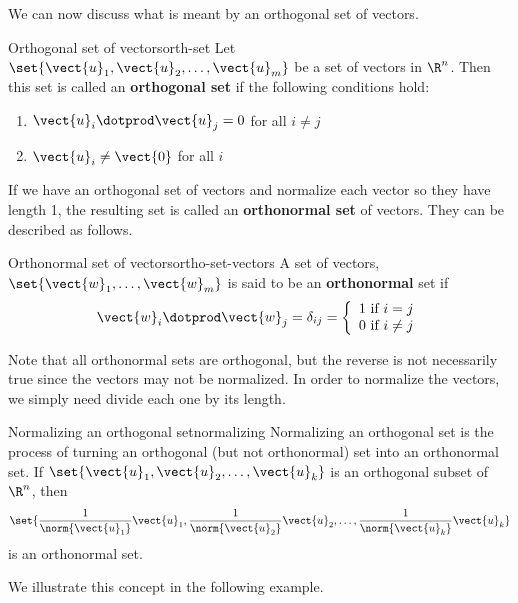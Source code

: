 We can now discuss what is meant by an orthogonal set of vectors. 

\begin{definition}{Orthogonal set of vectors}{orth-set}
Let $\set{\vect{u}_1, \vect{u}_2,\ldots, \vect{u}_m}$ be a set of
vectors in $\R^n$. Then this set is called an
\textbf{orthogonal set}
if the following conditions hold:
\begin{enumerate}
\item 
$\vect{u}_i \dotprod \vect{u}_j = 0$ for all $i \neq j$ 
\item
$\vect{u}_i \neq \vect{0}$ for all $i$
\end{enumerate}
\end{definition}

If we have an orthogonal set of vectors and normalize each vector so
they have length 1, the resulting set is called an \textbf{orthonormal
set} of vectors. They can be described as follows.

\begin{definition}{Orthonormal set of vectors}{ortho-set-vectors}
A set of vectors, $\set{\vect{w}_{1},\ldots,\vect{w}_{m}} $
is said to be an
\textbf{orthonormal}
set if 
\[
\vect{w}_i \dotprod \vect{w}_j = \delta _{ij} = \left\{
\begin{array}{c}
1\text{ if }i=j \\ 
0\text{ if }i\neq j
\end{array}
\right.
\]
\end{definition}

Note that all orthonormal sets are orthogonal, but the reverse is not
necessarily true since the vectors may not be normalized. In order to
normalize the vectors, we simply need divide each one by its length.

\begin{definition}{Normalizing an orthogonal set}{normalizing}
Normalizing an orthogonal set is the process of 
turning an orthogonal (but not orthonormal) set into
an orthonormal set.
If $\set{\vect{u}_1, \vect{u}_2, \ldots, \vect{u}_k}$
is an orthogonal subset of $\R^n$, 
then 
\[ \set{
\frac{1}{\norm{\vect{u}_1}}\vect{u}_1,
\frac{1}{\norm{\vect{u}_2}}\vect{u}_2, \ldots,
\frac{1}{\norm{\vect{u}_k}}\vect{u}_k }
\]
is an orthonormal set.
\end{definition}

We illustrate this concept in the following example. 

